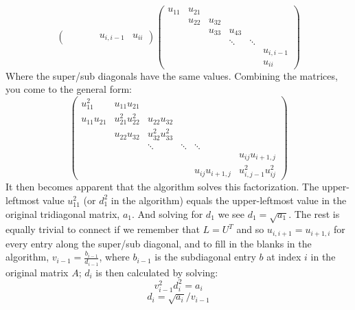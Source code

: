 \documentclass[11pt,a4paper,draft]{article}
\begin{document}
\begin{itemize}
\begin{enumerate} [label={\alph*)}]
$$\begin{pmatrix}
				   &        &        &        & u_{i,i-1}  & u_{ii}
			\end{pmatrix}
			\begin{pmatrix}
			u_{11} & u_{21} &        &        &        &            \\ 
				   & u_{22} & u_{32} &        &        &            \\
				   &        & u_{33} & u_{43} &        &            \\
				   &        &        & \ddots & \ddots &            \\
				   &        &        &        &        & u_{i,i-1}  \\
				   &        &        &        &        & u_{ii}
			\end{pmatrix}
			$$
			Where the super/sub diagonals have the same values. Combining the matrices, you come to the general form:
			$$\begin{pmatrix}
			u^2_{11}     &     u_{11}u_{21}   &                    &        &                  &                    \\ 
			u_{11}u_{21} &   u^2_{21}u^2_{22} &    u_{22}u_{32}    &        &                  &                     \\
			             &     u_{22}u_{32}   &  u^2_{32}u^2_{33}  &        &                  &                     \\
			             &                    &      \ddots        & \ddots &     \ddots       &                     \\
		 	             &                    &        			   &        &                  &  u_{ij}u_{i+1,j}     \\
			             &                    &       			   &        & u_{ij}u_{i+1,j}  & u^2_{i,j-1}u^2_{ij}
			\end{pmatrix}
			$$
			It then becomes apparent that the algorithm solves this factorization. The upper-leftmost value $u^2_{11}$ (or $d^2_1$ in the algorithm) equals the upper-leftmost value in the original tridiagonal matrix, $a_1$. And solving for $d_1$ we see $d_1 = \sqrt{a_1}$. The rest is equally trivial to connect if we remember that $L=U^T$ and so $u_{i,i+1} = u_{i+1,i}$ for every entry along the super/sub diagonal, and to fill in the blanks in the algorithm, $v_{i-1} = \frac{b_{i-1}}{d_{i-1}}$, where $b_{i-1}$ is the subdiagonal entry $b$ at index $i$ in the original matrix $A$; $d_i$ is then calculated by solving:
			$$v^2_{i-1}d^2_i = a_i$$ $$d_i = \sqrt{a_i}/v_{i-1}$$
			

\end{enumerate}
\end{itemize}
\end{document}
